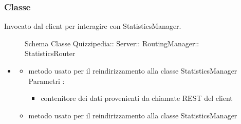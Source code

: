 \subsubsection{Classe }
Invocato dal client per interagire con StatisticsManager.
\begin{figure}[H]
\centering
\noindent{}
\caption[Schema Classe StatisticsRouter]{Schema Classe Quizzipedia:: Server:: RoutingManager:: StatisticsRouter}
\end{figure}
\begin{itemize}
\item {}
\begin{itemize}
\item {}
\newline
metodo usato per il reindirizzamento alla classe StatisticsManager
\newline
Parametri :
\begin{itemize}
\item {}
\newline
contenitore dei dati provenienti da chiamate REST del client
\end{itemize}
\item {}
\newline
metodo usato per il reindirizzamento alla classe StatisticsManager
\newline
\end{itemize}
\end{itemize}
